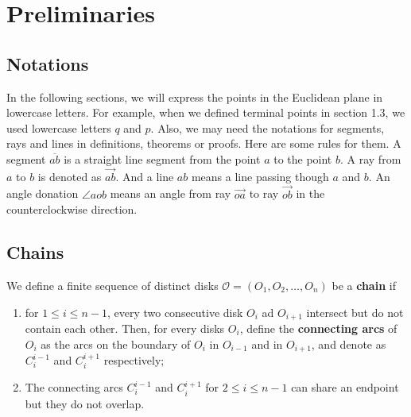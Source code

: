 \chapter{Preliminaries}


\section{Notations}
In the following sections, we will express the points in the Euclidean plane in lowercase letters. For example, when we defined terminal points in section 1.3, we used lowercase letters $q$ and $p$. Also, we  may need  the notations for segments, rays and lines in definitions, theorems or proofs. Here are some rules for them. A segment $\overline{ab}$ is a straight line segment from the point $a$ to the point $b$. A ray from $a$ to $b$ is denoted as $\overrightarrow{ab}$. And a line $ab$ means a line passing though $a$ and $b$. An angle donation $\angle aob$ means an angle from ray $\overrightarrow{oa}$ to  ray $\overrightarrow{ob}$ in the counterclockwise direction. 






\section{Chains}
\begin{definition}
We define a finite sequence of distinct disks $\mathcal{O} = (O_1, O_2, \dots, O_n)$ be a \textbf{chain} if
\begin{enumerate}
    \item for $1\le i \le n-1$, every two consecutive disk $O_i$ ad $O_{i+1}$ intersect but do not contain each other. Then, for every disks $O_i$, define the \textbf{connecting arcs} of $O_i$ as the arcs on the boundary of $O_i$ in $O_{i-1}$  and in $O_{i+1}$, and denote as $C_{i}^{i-1}$ and $C_{i}^{i+1}$ respectively;
    \item The connecting arcs $C_{i}^{i-1}$ and $C_{i}^{i+1}$ for $2\le i\le n-1$ can share an endpoint but they do not overlap.
\end{enumerate}
\end{definition}


